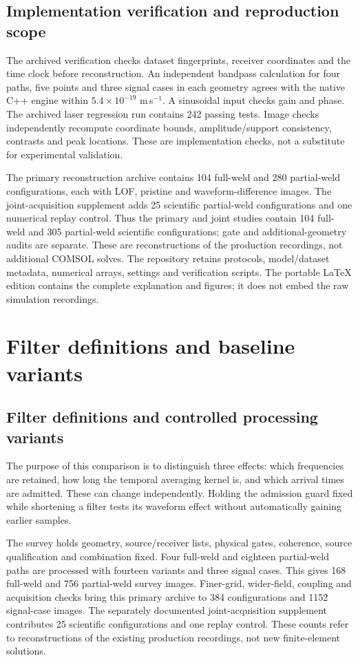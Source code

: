 \subsection{Implementation verification and reproduction scope}
The archived verification checks dataset fingerprints, receiver coordinates
and the time clock before reconstruction. An independent bandpass calculation
for four paths, five points and three signal cases in each geometry agrees
with the native C++ engine within $5.4\times10^{-19}$ m\,s$^{-1}$.
A sinusoidal input checks gain and phase. The archived laser regression run
contains 242 passing tests. Image checks independently recompute coordinate
bounds, amplitude/support consistency, contrasts and peak locations. These
are implementation checks, not a substitute for experimental validation.

The primary reconstruction archive contains 104 full-weld and 280
partial-weld configurations, each with LOF, pristine and waveform-difference
images. The joint-acquisition supplement adds 25 scientific partial-weld
configurations and one numerical replay control. Thus the primary and joint
studies contain 104 full-weld and 305 partial-weld scientific configurations;
gate and additional-geometry audits are separate. These are reconstructions
of the production recordings, not additional COMSOL solves. The repository
retains protocols, model/dataset metadata, numerical arrays, settings and
verification scripts. The portable LaTeX edition contains the complete
explanation and figures; it does not embed the raw simulation recordings.


\section{Filter definitions and baseline variants}
\subsection{Filter definitions and controlled processing variants}\label{saftapp:archive:shared:filter_details}
The purpose of this comparison is to distinguish three effects: which frequencies are retained, how long the temporal averaging kernel is, and which arrival times are admitted. These can change independently. Holding the admission guard fixed while shortening a filter tests its waveform effect without automatically gaining earlier samples.

The survey holds geometry, source/receiver lists, physical gates, coherence, source qualification and combination fixed. Four full-weld and eighteen partial-weld paths are processed with fourteen variants and three signal cases. This gives 168 full-weld and 756 partial-weld survey images. Finer-grid, wider-field, coupling and acquisition checks bring this primary archive to 384 configurations and 1152 signal-case images. The separately documented joint-acquisition supplement contributes 25 scientific configurations and one replay control. These counts refer to reconstructions of the existing production recordings, not new finite-element solutions.

